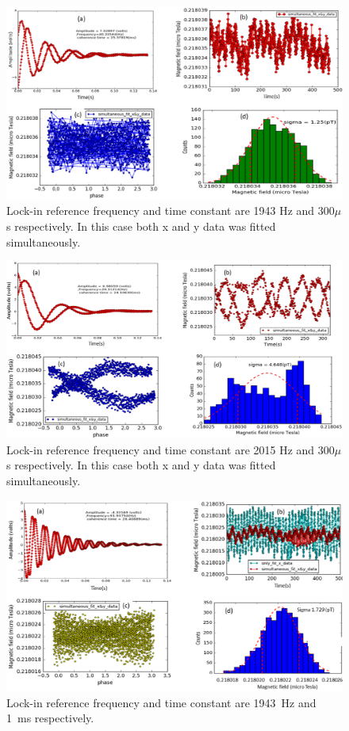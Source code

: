   \begin{figure}[h]
\centering\includegraphics[width=0.8\linewidth]{figures/freq_1943_simultaneous_fit_300microsec_.png}
\caption{Lock-in reference frequency and time constant are 1943 Hz and 300$\mu$s respectively. In this case both x and y data was fitted simultaneously. \label{fig:freq_1943_simultaneous_fit_300_micro_sec}}
\end{figure}

 \begin{figure}[h]
\centering\includegraphics[width=0.8\linewidth]{figures/freq_2015_simultaneous_fit_300microsec.png}
\caption{Lock-in reference frequency and time constant are 2015 Hz and 300$\mu$s respectively. In this case both x and y data was fitted simultaneously. \label{fig:freq_2015_simultaneous_fit_300_micros}}
\end{figure}

  \begin{figure}[h]
\centering\includegraphics[width=0.8\linewidth]{figures/freq_1943_simultaneous_fit_1ms.png}
\caption{Lock-in reference frequency and time constant are 1943~Hz and 1~ms respectively.  \label{fig:freq_1943_simultaneous_fit_1ms}}
\end{figure}

